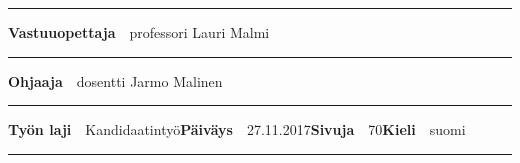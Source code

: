 \begin{spacing}{.88}
{\vspace{-2.4mm}\rule{\textwidth}{.75pt}

{\fontsize{10.5pt}{10.5pt}\bfseries\sffamily\lsstyle Vastuuopettaja}~~{\small professori Lauri Malmi}

\vspace{-2.4mm}\rule{\textwidth}{.75pt}

{\fontsize{10.5pt}{10.5pt}\bfseries\sffamily\lsstyle Ohjaaja}~~{\small dosentti Jarmo Malinen}

\vspace{-2.4mm}\rule{\textwidth}{.75pt}

{\fontsize{10.5pt}{10.5pt}\bfseries\sffamily\lsstyle Työn laji}~~{\small Kandidaatintyö}\hfill{\fontsize{10.5pt}{10.5pt}\bfseries\sffamily\lsstyle Päiväys}~~{\small 27.11.2017}\hfill{\fontsize{10.5pt}{10.5pt}\bfseries\sffamily\lsstyle Sivuja}~~{\small 70}\hfill{\fontsize{10.5pt}{10.5pt}\bfseries\sffamily\lsstyle Kieli}~~{\small suomi}

\vspace{-2.4mm}\rule{\textwidth}{.75pt}

\vspace{6mm}

} %
\end{spacing}
